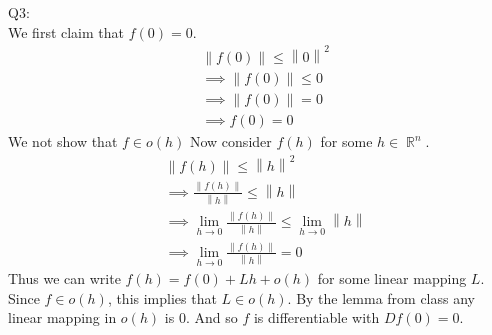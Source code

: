\documentclass[letterpaper]{article}
\DeclareMathOperator{\R}{\mathbb{R}}
\newcommand{\norm}[1]{\left\lVert#1\right\rVert}
\begin{document}
Q3:\\
We first claim that $f(0)=0$. 
\begin{align*}
    & \norm{f(0)} \leq \norm{0}^2
    \\ & \implies \norm{f(0)} \leq 0
    \\ & \implies \norm{f(0)} = 0
    \\ & \implies f(0) = 0
\end{align*}
We not show that $f \in o(h)$ Now consider $f(h)$ for some $h\in \R^n$. 
\begin{align*}
    & \norm{f(h)} \leq \norm{h}^2
    \\ & \implies \frac{\norm{f(h)}}{\norm{h}} \leq \norm{h}
    \\ & \implies \lim_{h \rightarrow 0} \frac{\norm{f(h)}}{\norm{h}} \leq \lim_{h\rightarrow 0} \norm{h}
    \\ & \implies \lim_{h \rightarrow 0 } \frac{\norm{f(h)}}{\norm{h}} = 0
\end{align*}
Thus we can write $f(h) = f(0) + Lh + o(h)$ for some linear mapping $L$. Since $f\in o(h)$, this implies that $L\in o(h)$. By the lemma from class any linear mapping in $o(h)$ is 0. And so $f$ is differentiable with $Df(0)=0$. 
\end{document}
